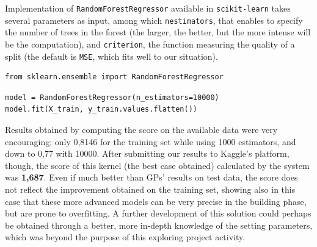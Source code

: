 Implementation of \texttt{RandomForestRegressor} available in \texttt{scikit-learn} takes several parameters as input, among which \texttt{n\textunderscore estimators}, that enables to specify the number of trees in the forest (the larger, the better, but the more intense will be the computation), and \texttt{criterion}, the function measuring the quality of a split (the default is \texttt{MSE}, which fits well to our situation).

\begin{lstlisting}[firstnumber=14]
from sklearn.ensemble import RandomForestRegressor
\end{lstlisting}

\begin{lstlisting}[firstnumber=115]
model = RandomForestRegressor(n_estimators=10000)
model.fit(X_train, y_train.values.flatten())
\end{lstlisting}


Results obtained by computing the score on the available data were very encouraging: only 0,8146 for the training set while using 1000 estimators, and down to 0,77
with 10000. After submitting our results to Kaggle's platform, though, the score of this kernel (the best case obtained) calculated by the system was \textbf{1,687}. Even if much better than GPs' results on test data, the score does not reflect the improvement obtained on the training set, showing also in this case that these more advanced models can be very precise in the building phase, but are prone to overfitting. A further development of this solution could perhaps be obtained through a better, more in-depth knowledge of the setting parameters, which was beyond the purpose of this exploring project activity.
